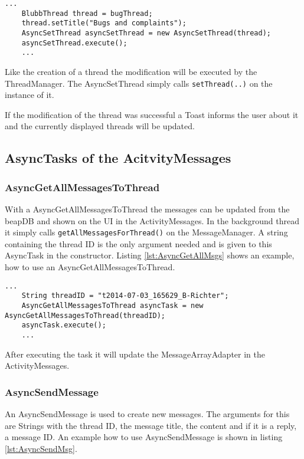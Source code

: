 \documentclass[12pt,a4paper,oneside]{report}
\newcommand{\beapDB}{beapDB}
\newcommand{\code}[1]{\lstinline{#1}}
\begin{document}
\begin{lstlisting}[caption=AsyncSetThread example, label=lst:AsyncSetThread]
	...
	BlubbThread thread = bugThread;
	thread.setTitle("Bugs and complaints");
	AsyncSetThread asyncSetThread = new AsyncSetThread(thread);
	asyncSetThread.execute();
	...
\end{lstlisting}
Like the creation of a thread the modification will be executed by the ThreadManager. The AsyncSetThread simply calls \code{setThread(..)} on the instance of it.

If the modification of the thread was successful a Toast informs the user about it and the currently displayed threads will be updated.

\subsection{AsyncTasks of the AcitvityMessages}

\subsubsection{AsyncGetAllMessagesToThread} \label{subsubsec:AsyncGetAllMessagesToThread}
With a AsyncGetAllMessagesToThread the messages can be updated from the \beapDB{} and shown on the UI in the ActivityMessages. In the background thread it simply calls \code{getAllMessagesForThread()} on the MessageManager. A string containing the thread ID is the only argument needed and is given to this AsyncTask in the constructor. Listing \ref{lst:AsyncGetAllMsgs} shows an example, how to use an AsyncGetAllMessagesToThread.
\begin{lstlisting}[caption=AsyncGetAllMessagesToThread example, label=lst:AsyncGetAllMsgs]
	...
	String threadID = "t2014-07-03_165629_B-Richter";
	AsyncGetAllMessagesToThread asyncTask = new AsyncGetAllMessagesToThread(threadID);
	asyncTask.execute();
	...
\end{lstlisting}

After executing the task it will update the MessageArrayAdapter in the ActivityMessages.

\subsubsection{AsyncSendMessage}
An AsyncSendMessage is used to create new messages. The arguments for this are Strings with the thread ID, the message title, the content and if it is a reply, a message ID. An example how to use AsyncSendMessage is shown in listing \ref{lst:AsyncSendMsg}.
\end{document}
